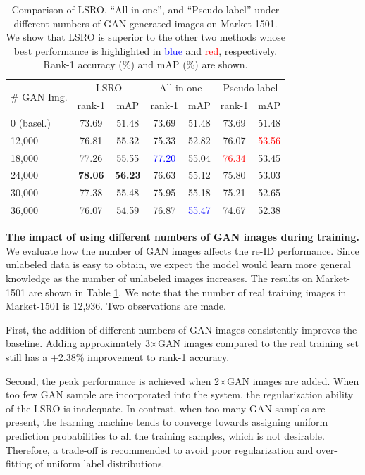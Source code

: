 \documentclass[10pt,twocolumn,letterpaper]{article}
\begin{document}
\setlength{\tabcolsep}{4pt}
\begin{table}
\small
\begin{center}
\begin{tabular}{l|cc|cc|cc}
\hline
\multirow{2}{*}{\# GAN Img.} & \multicolumn{2}{c|}{LSRO} & \multicolumn{2}{c|}{All in one} & \multicolumn{2}{c}{Pseudo label}\\
& rank-1 & mAP & rank-1  & mAP& rank-1  & mAP \\
\hline
0 (basel.) & 73.69 & 51.48  & 73.69 & 51.48  & 73.69 & 51.48\\ 
12,000 & 76.81 & 55.32 & 75.33 & 52.82 & 76.07 & \textcolor{red}{53.56} \\    
18,000 & 77.26 & 55.55 & \textcolor{blue}{77.20} & 55.04 & \textcolor{red}{76.34} & 53.45\\
24,000 & \textbf{78.06} & \textbf{56.23} & 76.63 & 55.12 & 75.80 & 53.03\\
30,000 & 77.38 & 55.48& 75.95 &55.18& 75.21 & 52.65 \\ 
36,000 & 76.07 & 54.59& 76.87 &\textcolor{blue}{55.47} & 74.67 & 52.38\\
\hline
\end{tabular}
\end{center}
\caption{Comparison of LSRO, ``All in one'', and ``Pseudo label'' under different numbers of GAN-generated images on Market-1501. We show that LSRO is superior to the other two methods whose best performance is highlighted in \textcolor{blue}{blue} and \textcolor{red}{red}, respectively. Rank-1 accuracy (\%) and mAP (\%) are shown.}
\label{table:bigdata}
\end{table}

\textbf{The impact of using different numbers of GAN images during training.} 
We evaluate how the number of GAN images affects the re-ID performance. Since unlabeled data is easy to obtain, we expect the model would learn more general knowledge as the number of unlabeled images increases. The results on Market-1501 are shown in Table \ref{table:bigdata}. We note that the number of real training images in Market-1501 is 12,936. Two observations are made. 

First, the addition of different numbers of GAN images consistently improves the baseline. Adding approximately 3$\times$GAN images compared to the real training set still has a +2.38\% improvement to rank-1 accuracy. 

Second, the peak performance is achieved when 2$\times$GAN images are added. When too few GAN sample are incorporated into the system, the regularization ability of the LSRO is inadequate. In contrast, when too many GAN samples are present, the learning machine tends to converge towards assigning uniform prediction probabilities to all the training samples, which is not desirable. Therefore, a trade-off is recommended to avoid poor regularization and over-fitting of uniform label distributions.
\end{document}
